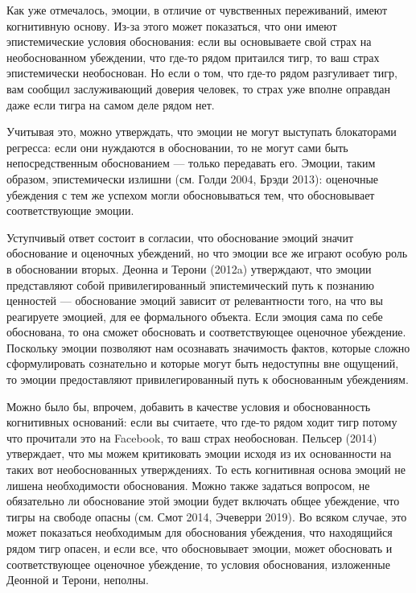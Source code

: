 \documentclass[11pt]{book}
\begin{document}
Как уже отмечалось, эмоции, в отличие от чувственных переживаний, имеют когнитивную основу. Из-за этого может показаться, что они имеют эпистемические условия обоснования: если вы основываете свой страх на необоснованном убеждении, что где-то рядом притаился тигр, то ваш страх эпистемически необоснован. Но если о том, что где-то рядом разгуливает тигр, вам сообщил заслуживающий доверия человек, то страх уже вполне оправдан даже если тигра на самом деле рядом нет.

Учитывая это, можно утверждать, что эмоции не могут выступать блокаторами регресса: если они нуждаются в обосновании, то не могут сами быть непосредственным обоснованием --- только передавать его. Эмоции, таким образом, эпистемически излишни (см. Голди 2004, Брэди 2013): оценочные убеждения с тем же успехом могли обосновываться тем, что обосновывает соответствующие эмоции.

Уступчивый ответ состоит в согласии, что обоснование эмоций значит обоснование и оценочных убеждений, но что эмоции все же играют особую роль в обосновании вторых. Деонна и Терони (2012a) утверждают, что эмоции представляют собой привилегированный эпистемический путь к познанию ценностей --- обоснование эмоций зависит от релевантности того, на что вы реагируете эмоцией, для ее формального объекта. Если эмоция сама по себе обоснована, то она сможет обосновать и соответствующее оценочное убеждение. Поскольку эмоции позволяют нам осознавать значимость фактов, которые сложно сформулировать сознательно и которые могут быть недоступны вне ощущений, то эмоции предоставляют привилегированный путь к обоснованным убеждениям.

Можно было бы, впрочем, добавить в качестве условия и обоснованность когнитивных оснований: если вы считаете, что где-то рядом ходит тигр потому что прочитали это на Facebook, то ваш страх необоснован. Пельсер (2014) утверждает, что мы можем критиковать эмоции исходя из их основанности на таких вот необоснованных утверждениях. То есть когнитивная основа эмоций не лишена необходимости обоснования. Можно также задаться вопросом, не обязательно ли обоснование этой эмоции будет включать общее убеждение, что тигры на свободе опасны (см. Смот 2014, Эчеверри 2019). Во всяком случае, это может показаться необходимым для обоснования убеждения, что находящийся рядом тигр опасен, и если все, что обосновывает эмоции, может обосновать и соответствующее оценочное убеждение, то условия обоснования, изложенные Деонной и Терони, неполны.
\end{document}
